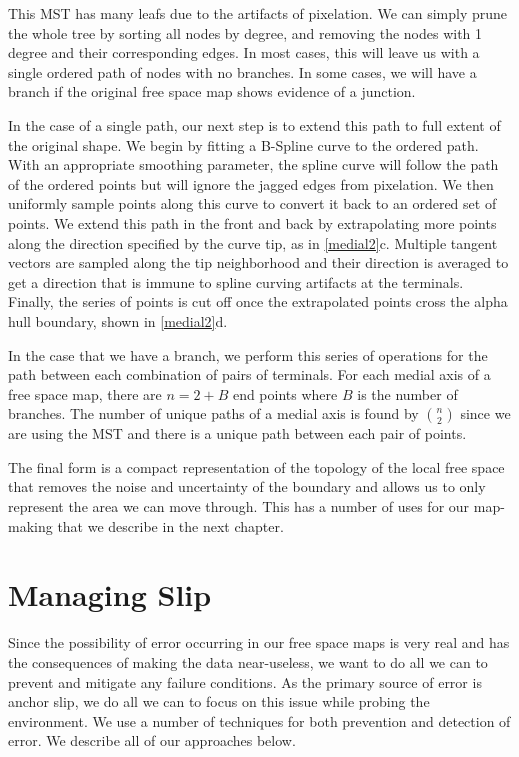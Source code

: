This MST has many leafs due to the artifacts of pixelation. We can simply prune the whole tree by sorting all nodes by degree, and removing the nodes with 1 degree and their corresponding edges. In most cases, this will leave us with a single ordered path of nodes with no branches. In some cases, we will have a branch if the original free space map shows evidence of a junction.

In the case of a single path, our next step is to extend this path to full extent of the original shape. We begin by fitting a B-Spline curve to the ordered path. With an appropriate smoothing parameter, the spline curve will follow the path of the ordered points but will ignore the jagged edges from pixelation. We then uniformly sample points along this curve to convert it back to an ordered set of points. We extend this path in the front and back by extrapolating more points along the direction specified by the curve tip, as in \autoref{medial2}c. Multiple tangent vectors are sampled along the tip neighborhood and their direction is averaged to get a direction that is immune to spline curving artifacts at the terminals. Finally, the series of points is cut off once the extrapolated points cross the alpha hull boundary, shown in \autoref{medial2}d.

In the case that we have a branch, we perform this series of operations for the path between each combination of pairs of terminals. For each medial axis of a free space map, there are $n = 2 + B$ end points where $B$ is the number of branches. The number of unique paths of a medial axis is found by ${n \choose 2}$ since we are using the MST and there is a unique path between each pair of points.

The final form is a compact representation of the topology of the local free space that removes the noise and uncertainty of the boundary and allows us to only represent the area we can move through. This has a number of uses for our map-making that we describe in the next chapter. 




\section{Managing Slip}
\label{managingslip}

Since the possibility of error occurring in our free space maps is very real and has the consequences of making the data near-useless, we want to do all we can to prevent and mitigate any failure conditions. As the primary source of error is anchor slip, we do all we can to focus on this issue while probing the environment. We use a number of techniques for both prevention and detection of error. We describe all of our approaches below.

